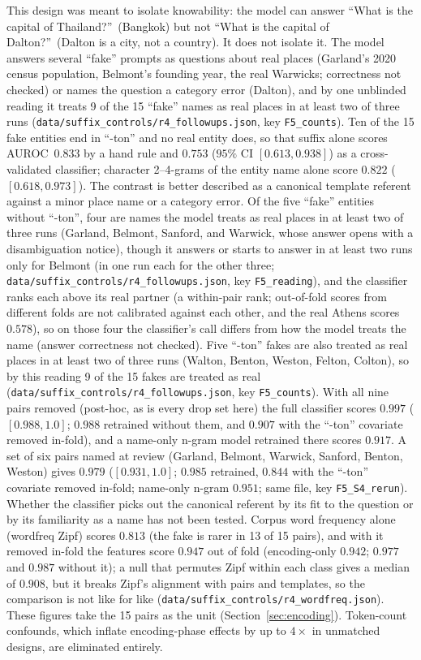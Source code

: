 \documentclass[11pt,a4paper]{article}
\begin{document}
This design was meant to isolate knowability: the model can
answer ``What is the capital of Thailand?''\ (Bangkok) but not ``What is
the capital of Dalton?''\ (Dalton is a city, not a country). It does not
isolate it. The model answers several ``fake'' prompts as questions about real places (Garland's 2020 census population, Belmont's founding year, the real Warwicks; correctness not checked) or names the question a category error (Dalton), and by one unblinded reading it treats 9 of the 15 ``fake'' names as real places in at least two of three runs (\texttt{data/suffix\_controls/r4\_followups.json}, key \texttt{F5\_counts}). Ten of the 15 fake entities end in
``-ton'' and no real entity does, so that suffix alone scores
AUROC~$0.833$ by a hand rule and $0.753$ ($95\%$ CI $[0.613, 0.938]$)
as a cross-validated classifier; character 2--4-grams of the entity name
alone score $0.822$ ($[0.618, 0.973]$). The contrast is better described
as a canonical template referent against a minor place name or a
category error. Of the five ``fake'' entities without ``-ton'', four are
names the model treats as real places in at least two of three runs (Garland, Belmont, Sanford,
and Warwick, whose answer opens with a disambiguation notice), though it answers or starts to answer in at least two runs only for Belmont (in one run each for the other three; \texttt{data/suffix\_controls/r4\_followups.json}, key \texttt{F5\_reading}), and the classifier ranks each above its real partner (a within-pair rank; out-of-fold scores from different folds are not calibrated against each other, and the real Athens scores $0.578$), so on those four the classifier's call differs from how the model treats the name (answer correctness not checked). Five ``-ton'' fakes are also treated as real places in at least two of three runs (Walton, Benton, Weston, Felton, Colton), so by this reading 9 of the 15 fakes are treated as real (\texttt{data/suffix\_controls/r4\_followups.json}, key \texttt{F5\_counts}). With all nine pairs removed (post-hoc, as is every drop set here) the full classifier scores $0.997$ ($[0.988, 1.0]$; $0.988$ retrained without them, and $0.907$ with the ``-ton'' covariate removed in-fold), and a name-only n-gram model retrained there scores $0.917$. A set of six pairs named at review (Garland, Belmont, Warwick, Sanford, Benton, Weston) gives $0.979$ ($[0.931, 1.0]$; $0.985$ retrained, $0.844$ with the ``-ton'' covariate removed in-fold; name-only n-gram $0.951$; same file, key \texttt{F5\_S4\_rerun}). Whether the classifier picks out the canonical referent by its fit to the question or by its familiarity as a name has not been tested. Corpus word frequency alone (wordfreq Zipf) scores $0.813$ (the fake is rarer in 13 of 15 pairs), and with it removed in-fold the features score $0.947$ out of fold (encoding-only $0.942$; $0.977$ and $0.987$ without it); a null that permutes Zipf within each class gives a median of $0.908$, but it breaks Zipf's alignment with pairs and templates, so the comparison is not like for like (\texttt{data/suffix\_controls/r4\_wordfreq.json}). These figures
take the 15 pairs as the unit (Section~\ref{sec:encoding}). Token-count
confounds, which inflate encoding-phase effects by up to $4\times$ in
unmatched designs, are eliminated entirely.
\end{document}
